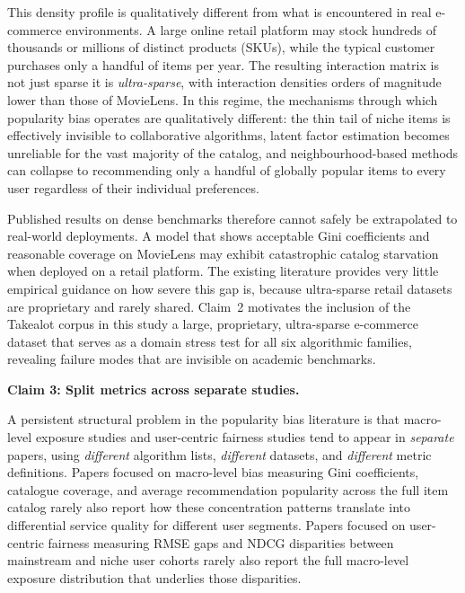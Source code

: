 \documentclass[11pt,a4paper]{report}
\begin{document}
This density profile is qualitatively different from what is encountered in real e-commerce environments. A large online retail platform may stock hundreds of thousands or millions of distinct products (SKUs), while the typical customer purchases only a handful of items per year. The resulting interaction matrix is not just sparse it is \emph{ultra-sparse}, with interaction densities orders of magnitude lower than those of MovieLens. In this regime, the mechanisms through which popularity bias operates are qualitatively different: the thin tail of niche items is effectively invisible to collaborative algorithms, latent factor estimation becomes unreliable for the vast majority of the catalog, and neighbourhood-based methods can collapse to recommending only a handful of globally popular items to every user regardless of their individual preferences.

Published results on dense benchmarks therefore cannot safely be extrapolated to real-world deployments. A model that shows acceptable Gini coefficients and reasonable coverage on MovieLens may exhibit catastrophic catalog starvation when deployed on a retail platform. The existing literature provides very little empirical guidance on how severe this gap is, because ultra-sparse retail datasets are proprietary and rarely shared. Claim~2 motivates the inclusion of the Takealot corpus in this study a large, proprietary, ultra-sparse e-commerce dataset that serves as a domain stress test for all six algorithmic families, revealing failure modes that are invisible on academic benchmarks.

\vspace{0.75em}
\noindent\textbf{Claim 3: Split metrics across separate studies.}

A persistent structural problem in the popularity bias literature is that macro-level exposure studies and user-centric fairness studies tend to appear in \emph{separate} papers, using \emph{different} algorithm lists, \emph{different} datasets, and \emph{different} metric definitions. Papers focused on macro-level bias measuring Gini coefficients, catalogue coverage, and average recommendation popularity across the full item catalog rarely also report how these concentration patterns translate into differential service quality for different user segments. Papers focused on user-centric fairness measuring RMSE gaps and NDCG disparities between mainstream and niche user cohorts rarely also report the full macro-level exposure distribution that underlies those disparities.
\end{document}
